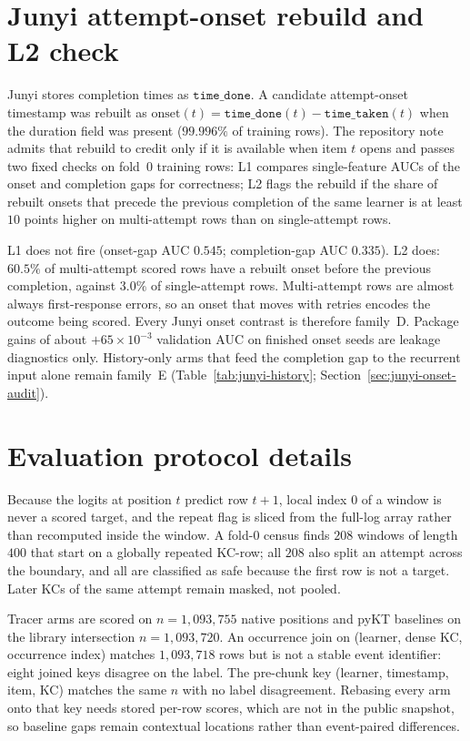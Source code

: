 \documentclass[review,12pt]{elsarticle}
\begin{document}
\FloatBarrier
\section{Junyi attempt-onset rebuild and L2 check}
\label{app:junyi-onset}
Junyi stores completion times as $\texttt{time\_done}$. A candidate
attempt-onset timestamp was rebuilt as
$\mathrm{onset}(t)=\texttt{time\_done}(t)-\texttt{time\_taken}(t)$ when
the duration field was present ($99.996\%$ of training rows). The
repository note admits that rebuild to credit only if it is available
when item $t$ opens and passes two fixed checks on fold~0 training
rows: L1 compares single-feature AUCs of the onset and completion gaps
for correctness; L2 flags the rebuild if the share of rebuilt onsets
that precede the previous completion of the same learner is at least
$10$ points higher on multi-attempt rows than on single-attempt rows.

L1 does not fire (onset-gap AUC $0.545$; completion-gap AUC $0.335$).
L2 does: $60.5\%$ of multi-attempt scored rows have a rebuilt onset
before the previous completion, against $3.0\%$ of single-attempt rows.
Multi-attempt rows are almost always first-response errors, so an onset
that moves with retries encodes the outcome being scored. Every Junyi
onset contrast is therefore family~D. Package gains of about
$+65\times 10^{-3}$ validation AUC on finished onset seeds are leakage
diagnostics only. History-only arms that feed the completion gap to the
recurrent input alone remain family~E
(Table~\ref{tab:junyi-history}; Section~\ref{sec:junyi-onset-audit}).

\FloatBarrier
\section{Evaluation protocol details}
\label{app:protocol-detail}
Because the logits at position $t$ predict row $t{+}1$, local index $0$
of a window is never a scored target, and the repeat flag is sliced
from the full-log array rather than recomputed inside the window. A
fold-0 census finds $208$ windows of length $400$ that start on a
globally repeated KC-row; all $208$ also split an attempt across the
boundary, and all are classified as safe because the first row is not a
target. Later KCs of the same attempt remain masked, not pooled.

Tracer arms are scored on $n{=}1{,}093{,}755$ native positions and pyKT
baselines on the library intersection $n{=}1{,}093{,}720$. An occurrence
join on (learner, dense KC, occurrence index) matches $1{,}093{,}718$
rows but is not a stable event identifier: eight joined keys disagree on
the label. The pre-chunk key (learner, timestamp, item, KC) matches the
same $n$ with no label disagreement. Rebasing every arm onto that key
needs stored per-row scores, which are not in the public snapshot, so
baseline gaps remain contextual locations rather than event-paired
differences.
\end{document}
